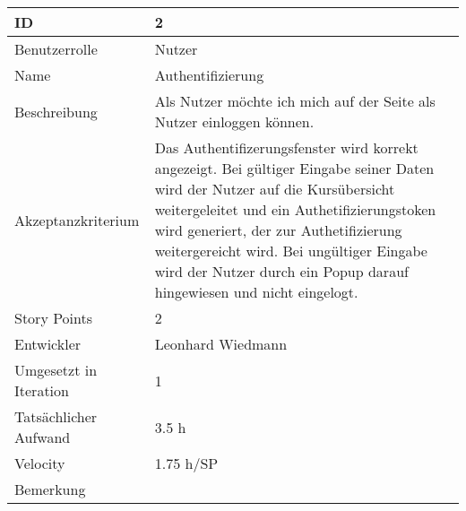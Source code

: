 \begin{tabularx}{\textwidth}{|p{}|X|}
	\hline
	ID & 2\\
	\hline
	Benutzerrolle & Nutzer\\
	\hline
	Name & Authentifizierung\\
	\hline
	Beschreibung & Als Nutzer möchte ich mich auf der Seite als Nutzer einloggen können.\\
	\hline
	Akzeptanzkriterium & Das Authentifizerungsfenster wird korrekt angezeigt. Bei gültiger Eingabe seiner Daten wird der Nutzer auf die Kursübersicht weitergeleitet und ein Authetifizierungstoken wird generiert, der zur Authetifizierung weitergereicht wird. Bei ungültiger Eingabe wird der Nutzer durch ein Popup darauf hingewiesen und nicht eingelogt.\\
	\hline
	Story Points & 2 \\
	\hline
	Entwickler & Leonhard Wiedmann\\
	\hline
	Umgesetzt in Iteration & 1\\
	\hline
	Tatsächlicher Aufwand & 3.5 h\\
	\hline
	Velocity & 1.75 h/SP\\
	\hline
	Bemerkung & \\
	\hline
\end{tabularx}
\vspace{20pt}
